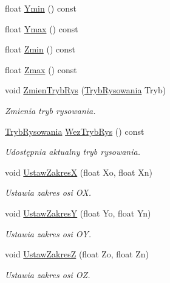 \begin{DoxyCompactItemize}
\item 
float \hyperlink{class_pz_g_1_1_lacze_do_g_n_u_plota_a9352c0382bfaeaaba9f65399a7383164}{Ymin} () const
\item 
float \hyperlink{class_pz_g_1_1_lacze_do_g_n_u_plota_ac54e4e7448ce3bd324efdc94a999f535}{Ymax} () const
\item 
float \hyperlink{class_pz_g_1_1_lacze_do_g_n_u_plota_a9068bd9a9873ba9c6d70016f1ae7cd7f}{Zmin} () const
\item 
float \hyperlink{class_pz_g_1_1_lacze_do_g_n_u_plota_a20a5d03e1fc19c682032bffc54340f12}{Zmax} () const
\item 
void \hyperlink{class_pz_g_1_1_lacze_do_g_n_u_plota_a10950349b348fd3a3d4143e95337527c}{Zmien\+Tryb\+Rys} (\hyperlink{namespace_pz_g_aeedae1ef10c66d720f9e89de408ca4ca}{Tryb\+Rysowania} Tryb)
\begin{DoxyCompactList}\small\item\em Zmienia tryb rysowania. \end{DoxyCompactList}\item 
\hyperlink{namespace_pz_g_aeedae1ef10c66d720f9e89de408ca4ca}{Tryb\+Rysowania} \hyperlink{class_pz_g_1_1_lacze_do_g_n_u_plota_a7c417f27b4b112f58a5be3ce6ea8d1fe}{Wez\+Tryb\+Rys} () const
\begin{DoxyCompactList}\small\item\em Udostępnia aktualny tryb rysowania. \end{DoxyCompactList}\item 
void \hyperlink{class_pz_g_1_1_lacze_do_g_n_u_plota_a9c91987dfc869d6fcea96205c581daef}{Ustaw\+ZakresX} (float Xo, float Xn)
\begin{DoxyCompactList}\small\item\em Ustawia zakres osi {\itshape OX}. \end{DoxyCompactList}\item 
void \hyperlink{class_pz_g_1_1_lacze_do_g_n_u_plota_a54c6e9cf9ab2eae479451fd953c2717c}{Ustaw\+ZakresY} (float Yo, float Yn)
\begin{DoxyCompactList}\small\item\em Ustawia zakres osi {\itshape OY}. \end{DoxyCompactList}\item 
void \hyperlink{class_pz_g_1_1_lacze_do_g_n_u_plota_a1dbbb2b86fb13b8632e6bad9df2a82e3}{Ustaw\+ZakresZ} (float Zo, float Zn)
\begin{DoxyCompactList}\small\item\em Ustawia zakres osi {\itshape OZ}. \end{DoxyCompactList}\item 

\end{DoxyCompactItemize}

